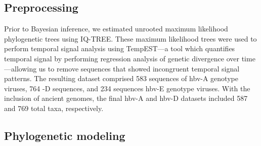 \subsection{Preprocessing}

Prior to Bayesian inference, we estimated unrooted maximum likelihood phylogenetic trees using IQ-TREE\cite{nguyen2015iq}.
These maximum likelihood trees were used to perform temporal signal analysis using TempEST\cite{rambaut2016exploring}---a tool which quantifies temporal signal by performing regression analysis of genetic divergence over time---allowing us to remove sequences that showed incongruent temporal signal patterns.
The resulting dataset comprised 583 sequences of \gls{hbv}-A genotype viruses, 764 -D sequences, and 234 sequences \gls{hbv}-E genotype viruses.
With the inclusion of ancient genomes, the final \gls{hbv}-A and \gls{hbv}-D datasets included 587 and 769 total taxa, respectively.

\subsection{Phylogenetic modeling}

